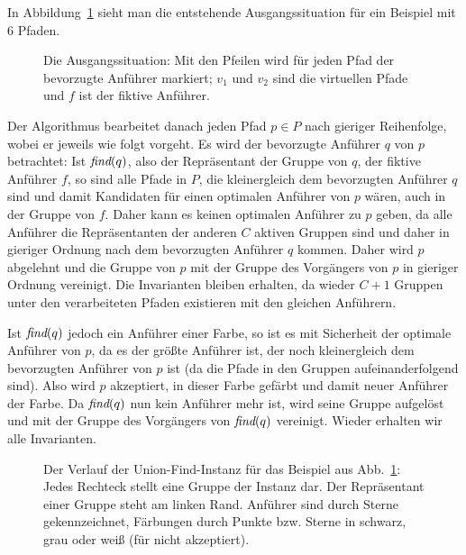 In Abbildung~\ref{fig:union-find-setup} sieht man die entstehende Ausgangssituation für ein Beispiel mit 6 Pfaden.

\begin{figure}[htbp]
	\centering
	\def\svgwidth{250bp}
	
	\caption{Die Ausgangssituation: Mit den Pfeilen wird für jeden Pfad der bevorzugte Anführer markiert; $v_1$ und $v_2$ sind die virtuellen Pfade und $f$ ist der fiktive Anführer.}
	\label{fig:union-find-setup}
\end{figure}

Der Algorithmus bearbeitet danach jeden Pfad $p \in P$ nach gieriger Reihenfolge, wobei er jeweils wie folgt vorgeht.
Es wird der bevorzugte Anführer $q$ von $p$ betrachtet:
Ist $\text{\em find}(q)$, also der Repräsentant der Gruppe von $q$, der fiktive Anführer $f$, so sind alle Pfade in $P$, die kleinergleich dem bevorzugten Anführer $q$
sind und damit Kandidaten für einen optimalen Anführer von $p$ wären, auch in der Gruppe von $f$. Daher kann es keinen optimalen Anführer zu $p$ geben,
da alle Anführer die Repräsentanten der anderen $C$ aktiven Gruppen sind und daher in gieriger Ordnung nach dem bevorzugten Anführer $q$ kommen.
Daher wird $p$ abgelehnt und die Gruppe von $p$ mit der Gruppe des Vorgängers von $p$ in gieriger Ordnung vereinigt.
Die Invarianten bleiben erhalten, da wieder $C+1$ Gruppen unter den verarbeiteten Pfaden existieren mit den gleichen
Anführern.

Ist $\text{\em find}(q)$ jedoch ein Anführer einer Farbe, so ist es mit Sicherheit der optimale Anführer von $p$, da es der größte
Anführer ist, der noch kleinergleich dem bevorzugten Anführer von $p$ ist (da die Pfade in den Gruppen
aufeinanderfolgend sind).
Also wird $p$ akzeptiert, in dieser Farbe gefärbt und damit neuer Anführer der Farbe.
Da $\text{\em find}(q)$ nun kein Anführer mehr ist, wird seine Gruppe aufgelöst und mit der Gruppe des Vorgängers von $\text{\em find}(q)$
vereinigt.
Wieder erhalten wir alle Invarianten.

\begin{figure}[htbp]
	\centering
	\def\svgwidth{250bp}
	
	\caption{Der Verlauf der Union-Find-Instanz für das Beispiel aus Abb.~\ref{fig:union-find-setup}: Jedes Rechteck stellt eine Gruppe der Instanz dar. Der Repräsentant einer Gruppe steht am linken Rand. Anführer sind durch Sterne gekennzeichnet, Färbungen durch Punkte bzw. Sterne in schwarz, grau oder weiß (für nicht akzeptiert).}
	\label{fig:union-find-structure}
\end{figure}

